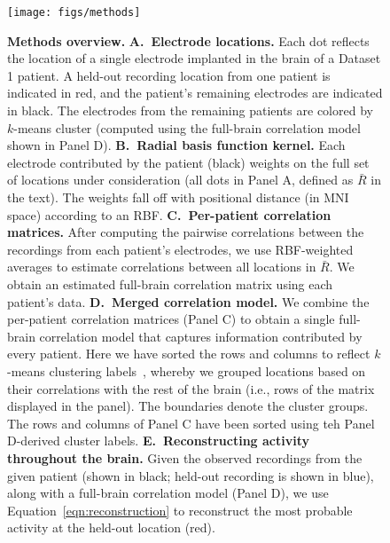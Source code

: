 \documentclass[11pt]{article}
\begin{document}
\begin{figure}
  \centering
  \texttt{[image: figs/methods]}
  \caption{\textbf{Methods overview.}  \textbf{A.~Electrode
      locations.}  Each dot reflects the location of a single
    electrode implanted in the brain of a Dataset 1 patient.  A
    held-out recording location from one patient is indicated in red,
    and the patient's remaining electrodes are indicated in black.
    The electrodes from the remaining patients are colored by
    $k$-means cluster (computed using the full-brain correlation model
    shown in Panel D).  \textbf{B.~Radial basis function kernel.}
    Each electrode contributed by the patient (black) weights on the
    full set of locations under consideration (all dots in Panel A,
    defined as $\bar{R}$ in the text).  The weights fall off with
    positional distance (in MNI space) according to an RBF.
    \textbf{C.~Per-patient correlation matrices.}  After computing the
    pairwise correlations between the recordings from each patient's
    electrodes, we use RBF-weighted averages to estimate correlations
    between all locations in $\bar{R}$.  We obtain an estimated
    full-brain correlation matrix using each patient's
    data. \textbf{D.~Merged correlation model.}  We combine the
    per-patient correlation matrices (Panel C) to obtain a single
    full-brain correlation model that captures information contributed
    by every patient.  Here we have sorted the rows and columns to
    reflect $k$-means clustering labels~\citep[using
    $k$=7;][]{YeoEtal11}, whereby we grouped locations based on their
    correlations with the rest of the brain (i.e., rows of the matrix
    displayed in the panel).  The boundaries denote the cluster
    groups.  The rows and columns of Panel C have been sorted using
    teh Panel D-derived cluster labels.  \textbf{E.~Reconstructing activity
      throughout the brain.}  Given the observed recordings from the
    given patient (shown in black; held-out recording is shown in
    blue), along with a full-brain correlation model (Panel D), we
    use Equation~\ref{eqn:reconstruction} to reconstruct the most
    probable activity at the held-out location (red).}
  \label{fig:methods}
\end{figure}
\end{document}
